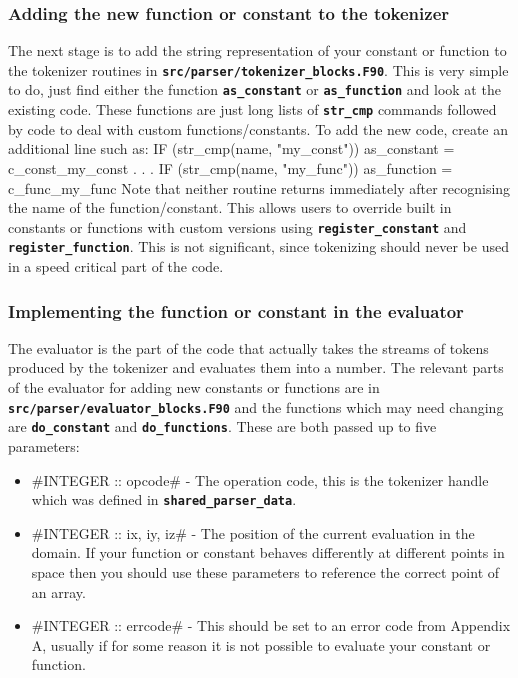 \documentclass[12pt,a4paper]{article}
\newcommand{\inlinecode}[1]{{\color{warwickred} \bf\texttt{#1}}}
\newenvironment{boxverbatim}{\lboxverbatim{none}}{\endlboxverbatim}
\begin{document}
\subsubsection{Adding the new function or constant to the tokenizer}
The next stage is to add the string representation of your constant or function
to the tokenizer routines in
\inlinecode{src/parser/tokenizer\_blocks.F90}. This is very simple to do, just
find either the function \inlinecode{as\_constant} or \inlinecode{as\_function}
and look at the existing code. These functions are just long lists of
\inlinecode{str\_cmp} commands followed by code to deal with custom
functions/constants. To add the new code, create an additional line such as:
\begin{boxverbatim}
  IF (str_cmp(name, "my_const")) as_constant = c_const_my_const
  .
  .
  .
  IF (str_cmp(name, "my_func"))  as_function = c_func_my_func
\end{boxverbatim}
Note that neither routine returns immediately after recognising the name of the
function/constant. This allows users to override built in constants or
functions with custom versions using \inlinecode{register\_constant} and
\inlinecode{register\_function}. This is not significant, since tokenizing
should never be used in a speed critical part of the code.

\subsubsection{Implementing the function or constant in the evaluator}
The evaluator is the part of the code that actually takes the streams of tokens
produced by the tokenizer and evaluates them into a number. The relevant parts
of the evaluator for adding new constants or functions are in
\inlinecode{src/parser/evaluator\_blocks.F90} and the functions which may need
changing are \inlinecode{do\_constant} and \inlinecode{do\_functions}. These are
both passed up to five parameters:
\begin{itemize}
\item #INTEGER :: opcode# - The operation code, this is the tokenizer handle
  which was defined in \inlinecode{shared\_parser\_data}.
\item #INTEGER :: ix, iy, iz# - The position of the current evaluation in the
  domain. If your function or constant behaves differently at different points
  in space then you should use these parameters to reference the correct point
  of an array.
\item #INTEGER :: errcode# - This should be set to an error code from
  Appendix A, usually\linebreak \inlinecode{c\_err\_bad\_value} if for some
  reason it is not possible to evaluate your constant or function.
\end{itemize}
\end{document}
